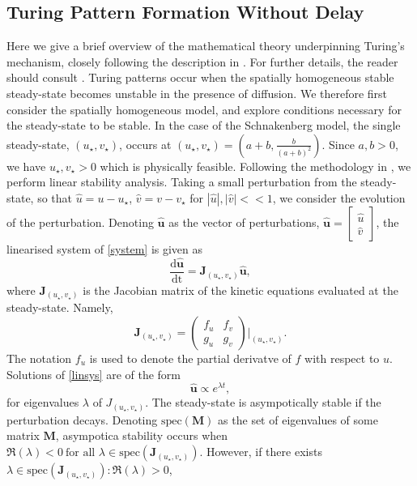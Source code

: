 \subsection{Turing Pattern Formation Without Delay}
Here we give a brief overview of the mathematical theory underpinning Turing's mechanism, closely following the description in \cite{murray}. For further details, the reader should consult \cite{murray,beentjes}. Turing patterns occur when the spatially homogeneous stable steady-state becomes unstable in the presence of diffusion. We therefore first consider the spatially homogeneous model, and explore conditions necessary for the steady-state to be stable. In the case of the Schnakenberg model, the single steady-state, $(u_\star, v_\star)$, occurs at $(u_\star, v_\star)=\left(a+b, \frac{b}{(a+b)^2}\right)$. Since $a,b>0$, we have $u_\star,v_\star>0$ which is physically feasible. Following the methodology in \cite{murray}, we perform linear stability analysis. Taking a small perturbation from the steady-state, so that $\hat{u}=u-u_\star$, $\hat{v}=v-v_\star$ for $|\hat{u}|, |\hat{v}|<<1$, we consider the evolution of the perturbation. Denoting $\hat{\textbf{u}}$ as the vector of perturbations, $\hat{\textbf{u}}=\begin{bmatrix}\hat{u} \\ \hat{v}\end{bmatrix}$, the linearised system of \eqref{system} is given as
\begin{equation}\label{linsys}
\frac{\text{d}\hat{\textbf{u}}}{\text{dt}}=\textbf{J}_{(u_\star,v_\star)}\hat{\textbf{u}},
\end{equation}
where $\textbf{J}_{(u_\star,v_\star)}$ is the Jacobian matrix of the kinetic equations evaluated at the steady-state. Namely,
$$
\textbf{J}_{(u_\star,v_\star)}=\begin{pmatrix}f_u&f_v\\g_u&g_v\end{pmatrix}\Bigg|_{(u_\star,v_\star)}.
$$
The notation $f_u$ is used to denote the partial derivatve of $f$ with respect to $u$. Solutions of \eqref{linsys} are of the form
$$
\hat{\textbf{u}}\propto e^{\lambda t},
$$
for eigenvalues $\lambda$ of $J_{(u_\star,v_\star)}$. The steady-state is asympotically stable if the perturbation decays.
Denoting $\text{spec}(\textbf{M})$ as the set of eigenvalues of some matrix $\textbf{M}$, asympotica stability occurs when $\Re(\lambda)<0 \ \text{for all }\lambda\in \text{spec}(\textbf{J}_{(u_\star,v_\star)})$. However, if there exists $\lambda\in \text{spec}(\textbf{J}_{(u_\star,v_\star)}): \Re(\lambda)>0$,
